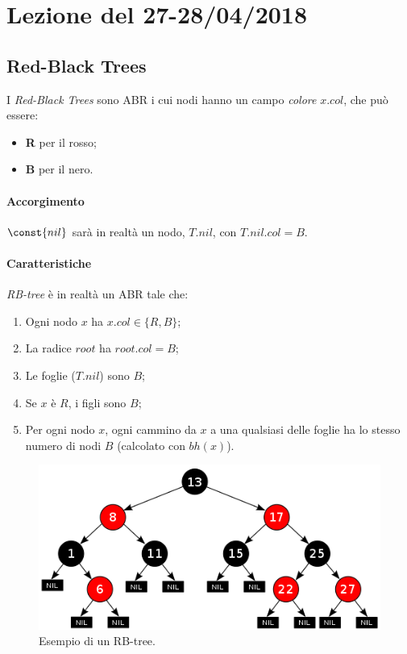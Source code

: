 \section{Lezione del 27-28/04/2018}

\subsection{Red-Black Trees}

I \emph{Red-Black Trees} sono ABR i cui nodi hanno un campo \emph{colore} $x.col$, che può essere:
\begin{itemize}[noitemsep]
    \item \textbf{R} per il rosso;
    \item \textbf{B} per il nero.
\end{itemize}

\paragraph{Accorgimento} $\const{nil}$ sarà in realtà un nodo,
$T.nil$, con $T.nil.col = B$.

\paragraph{Caratteristiche} \emph{RB-tree} è in realtà un ABR tale che:
\begin{enumerate}[label=($\arabic*$)]
    \item Ogni nodo $x$ ha $x.col \in \{R,B\}$; \label{rbtree:1}
    \item La radice $root$ ha $root.col = B$; \label{rbtree:2}
    \item Le foglie ($T.nil$) sono $B$; \label{rbtree:3}
    \item Se $x$ è $R$, i figli sono $B$; \label{rbtree:4}
    \item Per ogni nodo $x$, ogni cammino da $x$ a una qualsiasi delle foglie
    ha lo stesso numero di nodi $B$ (calcolato con $bh(x)$). \label{rbtree:5}
\end{enumerate} 

\begin{figure}[hbt]
    \centering
    \includegraphics[width=\textwidth]{img/rb-tree-ex.png}
    \caption{Esempio di un RB-tree.}
\end{figure}
\pagebreak

